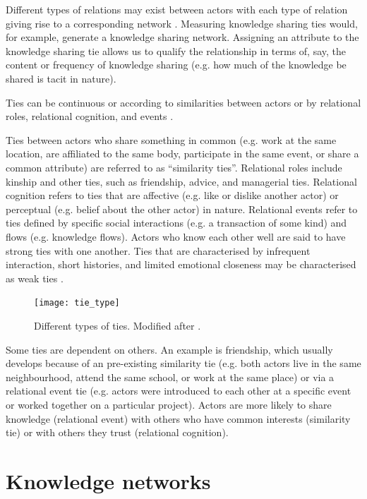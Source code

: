 Different types of relations may exist between actors with each type of relation giving rise to a corresponding network \citep{borgatti2013analyzing}. Measuring knowledge sharing ties would, for example, generate a knowledge sharing network. Assigning an attribute to the knowledge sharing tie allows us to qualify the relationship in terms of, say, the content or frequency of knowledge sharing (e.g. how much of the knowledge be shared is tacit in nature). \medskip

Ties can be continuous or  according to similarities between actors or by relational roles, relational cognition, and events \citep{borgatti2013analyzing}. \medskip

Ties between actors who share something in common (e.g. work at the same location, are affiliated to the same body, participate in the same event, or share a common attribute) are referred to as \enquote{similarity ties}. Relational roles include kinship and other ties, such as friendship, advice, and managerial ties. Relational cognition refers to ties that are affective (e.g. like or dislike another actor) or perceptual (e.g. belief about the other actor) in nature. Relational events refer to ties defined by specific social interactions (e.g. a transaction of some kind) and flows (e.g. knowledge flows). Actors who know each other well are said to have strong ties with one another. Ties that are characterised by infrequent interaction, short histories, and limited emotional closeness may be characterised as weak ties \citep{baer2010strength}. 

\begin{figure}
	\centering
	\texttt{[image: tie\_type]}
	\caption{Different types of ties. Modified after \citet{borgatti2009network}.}
	\label{fig:tie_type}
\end{figure}


Some ties are dependent on others. An example is friendship, which usually develops because of an pre-existing similarity tie (e.g. both actors live in the same neighbourhood, attend the same school, or work at the same place) or via a relational event tie (e.g. actors were introduced to each other at a specific event or worked together on a particular project). Actors are more likely to share knowledge (relational event) with others who have common interests (similarity tie) or with others they trust (relational cognition). \medskip 

\section{Knowledge networks}

